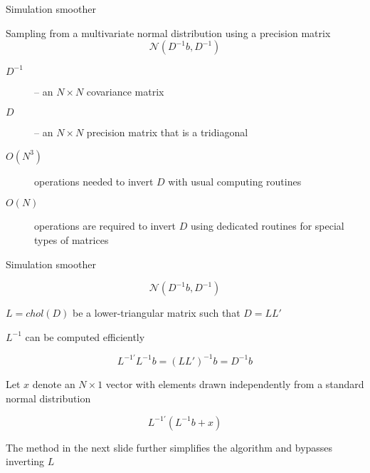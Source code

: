 \documentclass[notes,blackandwhite,mathsans,usenames,dvipsnames]{beamer}
\begin{document}
\begin{frame}{Simulation smoother}

{\color{mcxs2}Sampling from a multivariate normal distribution using a precision matrix}
\begin{equation*}
\mathcal{N}\left( D^{-1}b, D^{-1} \right)
\end{equation*}

\begin{description}
\item[$D^{-1}$] {\color{mcxs2}-- an} $N\times N$ {\color{mcxs2}covariance matrix}
\item[$D$] {\color{mcxs2}-- an} $N\times N$ {\color{mcxs2}precision matrix that is a tridiagonal}

\bigskip\item[$O\left(N^3\right)$] {\color{mcxs2}operations needed to invert} $D$ {\color{mcxs2}with usual computing routines}
\item[$O\left(N\right)$] {\color{mcxs2}operations are required to invert} $D$ {\color{mcxs2}using dedicated routines for special types of matrices}
\end{description}

\end{frame}





\begin{frame}{Simulation smoother}

\begin{equation*}
\mathcal{N}\left( D^{-1}b, D^{-1} \right)
\end{equation*}

 $L=chol(D)$ {\color{mcxs2}be a lower-triangular matrix such that }$D=LL'$

 $L^{-1}$ {\color{mcxs2}can be computed efficiently}

$$ L^{-1\prime}L^{-1}b = (LL')^{-1}b = D^{-1}b $$

{\color{mcxs2}Let} $x$ {\color{mcxs2}denote an} $N\times1$ {\color{mcxs2}vector with elements drawn independently from a standard normal distribution}

$$ L^{-1\prime}\left(L^{-1}b + x\right) $$

{\color{mcxs2}The method in the next slide further simplifies the algorithm and bypasses inverting} $L$ 
\end{frame}
\end{document}
